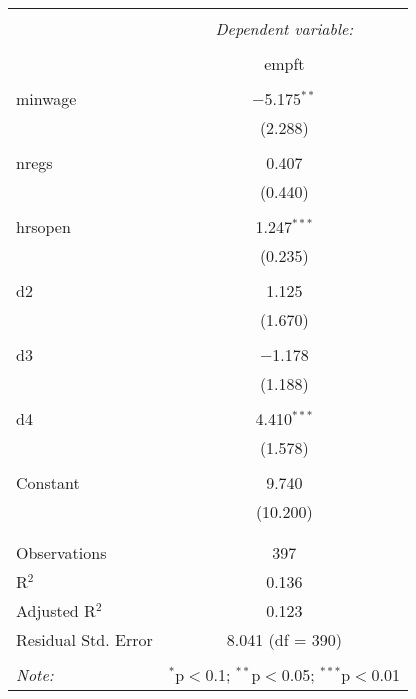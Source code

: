 
\begin{table}[!htbp] \centering 
  \caption{} 
  \label{} 
\begin{tabular}{@{\extracolsep{5pt}}lc} 
\\[-1.8ex]\hline 
\hline \\[-1.8ex] 
 & \multicolumn{1}{c}{\textit{Dependent variable:}} \\ 
\cline{2-2} 
\\[-1.8ex] & empft \\ 
\hline \\[-1.8ex] 
 minwage & $-$5.175$^{**}$ \\ 
  & (2.288) \\ 
  & \\ 
 nregs & 0.407 \\ 
  & (0.440) \\ 
  & \\ 
 hrsopen & 1.247$^{***}$ \\ 
  & (0.235) \\ 
  & \\ 
 d2 & 1.125 \\ 
  & (1.670) \\ 
  & \\ 
 d3 & $-$1.178 \\ 
  & (1.188) \\ 
  & \\ 
 d4 & 4.410$^{***}$ \\ 
  & (1.578) \\ 
  & \\ 
 Constant & 9.740 \\ 
  & (10.200) \\ 
  & \\ 
\hline \\[-1.8ex] 
Observations & 397 \\ 
R$^{2}$ & 0.136 \\ 
Adjusted R$^{2}$ & 0.123 \\ 
Residual Std. Error & 8.041 (df = 390) \\ 
\hline 
\hline \\[-1.8ex] 
\textit{Note:}  & \multicolumn{1}{r}{$^{*}$p$<$0.1; $^{**}$p$<$0.05; $^{***}$p$<$0.01} \\ 
\end{tabular} 
\end{table} 
